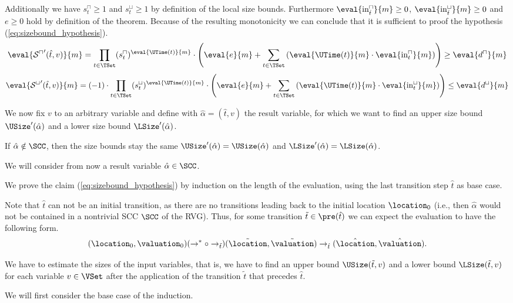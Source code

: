 Additionally we have $s^\sqcap_t \geq 1$ and $s^\sqcup_t \geq 1$ by definition of the local size bounds.
Furthermore $\eval{\text{in}^\sqcap_{\hat{t}}}{m} \geq 0$, $\eval{\text{in}^\sqcup_{\hat{t}}}{m} \geq 0$ and $e \geq 0$ hold by definition of the theorem.
Because of the resulting monotonicity we can conclude that it is sufficient to proof the hypothesis (\ref{eq:sizebound_hypothesis}). 
\[ \eval{{\mathcal{S}^\sqcap}'(\hat{t},v)}{m} =
   \prod_{t \in \TSet} (s^\sqcap_t)^{\eval{\UTime(t)}{m}} \cdot \left( \eval{e}{m} + \sum_{t \in \TSet} \left( \eval{\UTime(t)}{m} \cdot \eval{\text{in}^\sqcap_t}{m} \right) \right) \geq \eval{d^\sqcap}{m} \]
\[ \eval{{\mathcal{S}^\sqcup}'(\hat{t},v)}{m} =
   (-1) \cdot \prod_{t \in \TSet} (s^\sqcup_t)^{\eval{\UTime(t)}{m}} \cdot \left( \eval{e}{m} + \sum_{t \in \TSet} \left( \eval{\UTime(t)}{m} \cdot \eval{\text{in}^\sqcup_t}{m} \right) \right) \leq \eval{d^\sqcup}{m} \]

We now fix $v$ to an arbitrary variable and define with $\hat{\alpha} = (\hat{t}, v)$ the result variable, for which we want to find an upper size bound $\USize'(\hat{\alpha})$ and a lower size bound $\LSize'(\hat{\alpha})$.

If $\hat{\alpha} \notin \SCC$, then the size bounds stay the same $\USize'(\hat{\alpha}) = \USize(\hat{\alpha})$ and $\LSize'(\hat{\alpha}) = \LSize(\hat{\alpha})$.

We will consider from now a result variable $\hat{\alpha} \in \SCC$.

We prove the claim (\ref{eq:sizebound_hypothesis}) by induction on the length of the evaluation, using the last transition step $\hat{t}$ as base case.

Note that $\hat{t}$ can not be an initial transition, as there are no transitions leading back to the initial location $\location_0$
(i.e., then $\hat{\alpha}$ would not be contained in a nontrivial SCC $\SCC$ of the RVG).
Thus, for some transition $\tilde{t} \in \pre(\hat{t})$ we can expect the evaluation to have the following form.
\[ (\location_0, \valuation_0) (\rightarrow^* \circ \rightarrow_{\tilde{t}}) (\tilde{\location}, \tilde{\valuation}) \rightarrow_{\hat{t}} (\hat{\location}, \hat{\valuation}). \]

We have to estimate the sizes of the input variables, that is, we have to find an upper bound $\USize(\tilde{t}, v)$ and a lower bound $\LSize(\tilde{t}, v)$ for each variable $v \in \VSet$ after the application of the transition $\tilde{t}$ that precedes $\hat{t}$.

We will first consider the base case of the induction.

